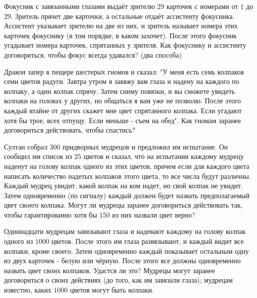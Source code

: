\documentclass[12pt]{book}
\begin{document}
\begin{task}
Фокусник с завязанными глазами выдаёт зрителю $29$ карточек с номерами от $1$ до $29$. Зритель прячет две карточки, а остальные отдаёт ассистенту фокусника. Ассистент указывает зрителю на две из них, и зритель называет номера этих карточек фокуснику (в том порядке, в каком захочет). После этого фокусник угадывает номера карточек, спрятанных у зрителя. Как фокуснику и ассистенту договориться, чтобы фокус всегда удавался? (два способа)
\end{task}

\begin{task}
Дракон запер в пещере шестерых гномов и сказал: "У меня есть семь колпаков семи цветов радуги. Завтра утром я завяжу вам глаза и надену на каждого по колпаку, а один колпак спрячу. Затем сниму повязки, и вы сможете увидеть колпаки на головах у других, но общаться я вам уже не позволю. После этого каждый втайне от других скажет мне цвет спрятанного колпака. Если угадают хотя бы трое, всех отпущу. Если меньше - съем на обед". Как гномам заранее договориться действовать, чтобы спастись?
\end{task}

\begin{task}
Султан собрал $300$ придворных мудрецов и предложил им испытание. Он сообщил им список из $25$ цветов и сказал, что на испытании каждому мудрецу наденут на голову колпак одного из этих цветов, причем если для каждого цвета написать количество надетых колпаков этого цвета, то все числа будут различны. Каждый мудрец увидит, какой колпак на ком надет, но свой колпак не увидит. Затем одновременно (по сигналу) каждый должен будет назвать предполагаемый цвет своего колпака. Могут ли мудрецы заранее договориться действовать так, чтобы гарантированно хотя бы $150$ из них назвали цвет верно?
\end{task}

\begin{task}
Одиннадцати мудрецам завязывают глаза и надевают каждому на голову колпак одного из $1000$ цветов. После этого им глаза развязывают, и каждый видит все колпаки, кроме своего. Затем одновременно каждый показывает остальным одну из двух карточек - белую или чёрную. После этого все должны одновременно назвать цвет своих колпаков. Удастся ли это? Мудрецы могут заранее договориться о своих действиях (до того, как им завязали глаза); мудрецам известно, каких $1000$ цветов могут быть колпаки. 
\end{task}
\end{document}
